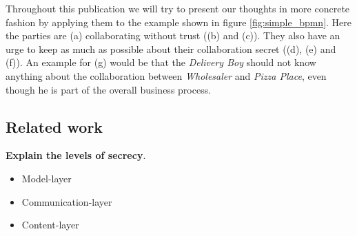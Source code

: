 \documentclass[runningheads]{llncs}
\newcommand{\ber}[1]{(\lowercase\expandafter{#1\relax})} %
\begin{document}
Throughout this publication we will try to present our thoughts in more concrete fashion by applying them to the example shown in figure \ref{fig:simple_bpmn}. Here the parties are \ber{a} collaborating without trust (\ber{b} and \ber{c}). They also have an urge to keep as much as possible about their collaboration secret (\ber{d}, \ber{e} and \ber{f}). An example for \ber{g} would be that the \textit{Delivery Boy} should not know anything about the collaboration between \textit{Wholesaler} and \textit{Pizza Place}, even though he is part of the overall business process. 

\begin{comment}
It displays the process of ordering, making and delivering pizza. In the process the \textit{Pizza Place} can decide weather to deliver straight away, using the \textit{Delivery Boy} as a middle man, or if it has order ingredients at the \textit{Wholesaler}. We chose a choreography diagram to display the process in order to emphasis the collaboration between the participants. Please keep in mind that in reality business processes might be much more complex and may involve many more participants. The example is kept simple on purpose and only serves as an illustration for our approach. 
\end{comment}




\subsection{Related work} \label{sec:rel_work}




\bigbreak
\textbf{Explain the levels of secrecy}. 
\begin{itemize}
    \item Model-layer
    \item Communication-layer
    \item Content-layer
\end{itemize}
\end{document}
